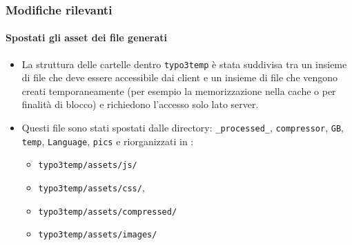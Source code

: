 \begin{frame}[fragile]
	\frametitle{Modifiche rilevanti}
	\framesubtitle{Spostati gli asset dei file generati}

	\lstset{basicstyle=\tiny\ttfamily}

	\begin{itemize}

		\item La struttura delle cartelle dentro \texttt{typo3temp} è stata suddivisa tra un insieme di file
			che deve essere accessibile dai client e un insieme di file che vengono creati temporaneamente (per 
			esempio la memorizzazione nella cache o per finalità di blocco) e richiedono l'accesso solo
			lato server.

		\item Questi file sono stati spostati dalle directory:\newline
			\texttt{\_processed\_}, \texttt{compressor}, \texttt{GB}, \texttt{temp},
			\texttt{Language}, \texttt{pics}\newline
			e riorganizzati in :

			\begin{itemize}
				\item \texttt{typo3temp/assets/js/}
				\item \texttt{typo3temp/assets/css/},
				\item \texttt{typo3temp/assets/compressed/}
				\item \texttt{typo3temp/assets/images/}
			\end{itemize}

	\end{itemize}

\end{frame}

